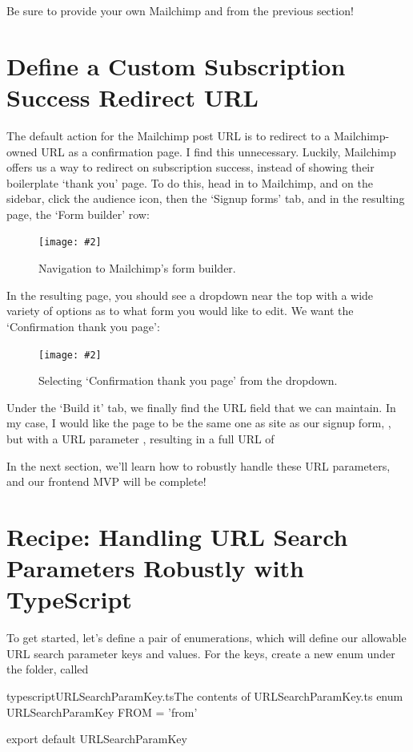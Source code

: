 \documentclass[a4paper,headinclude=on,footinclude=on,12pt,oneside]{scrbook}
\newcommand{\standardfigure}[3]{\begin{figure}[H]\begin{center}\texttt{[image: \#2]}\caption{#3}\label{fig:#2}\end{center}\end{figure}}
\begin{document}
Be sure to provide your own Mailchimp  and  from the previous section!

\section{Define a Custom Subscription Success Redirect URL}

The default action for the Mailchimp post URL is to redirect to a Mailchimp-owned URL as a confirmation page. I find this unnecessary. Luckily, Mailchimp offers us a way to redirect on subscription success, instead of showing their boilerplate `thank you' page. To do this, head in to Mailchimp, and on the sidebar, click the audience icon, then the `Signup forms' tab, and in the resulting page, the `Form builder' row:

\standardfigure{\textwidth}{frontend/mailchimp/navigation-to-form-builder}{Navigation to Mailchimp's form builder.}

In the resulting page, you should see a dropdown near the top with a wide variety of options as to what form you would like to edit. We want the `Confirmation thank you page':

\standardfigure{\textwidth}{frontend/mailchimp/confirmation-page-dropdown}{Selecting `Confirmation thank you page' from the dropdown.}

Under the `Build it' tab, we finally find the URL field that we can maintain. In my case, I would like the page to be the same one as site as our signup form, , but with a URL parameter , resulting in a full URL of 

In the next section, we'll learn how to robustly handle these URL parameters, and our frontend MVP will be complete!

\section{Recipe: Handling URL Search Parameters Robustly with TypeScript}

To get started, let's define a pair of enumerations, which will define our allowable URL search parameter keys and values. For the keys, create a new enum under the  folder, called 

\begin{codeInput}{typescript}{URLSearchParamKey.ts}{The contents of URLSearchParamKey.ts}
enum URLSearchParamKey {
  FROM = 'from'
}

export default URLSearchParamKey
\end{codeInput}
\end{document}
